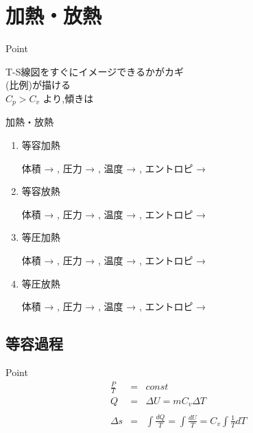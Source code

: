 \documentclass[a4paper]{jsarticle}
\begin{document}
\section{加熱・放熱}
\begin{itembox}[l]{Point}
    \begin{center}
        T-S線図をすぐにイメージできるかがカギ\\
        (比例)が描ける\\
        $C_p > C_v$ より,傾きは \\
    \end{center}
\end{itembox}
\begin{itembox}[l]{加熱・放熱}
    \begin{enumerate}[(1)]
        \item 等容加熱
              \begin{center}
                  体積 →  , 圧力 →  , 温度 →  , エントロピ → 
              \end{center}
        \item 等容放熱
              \begin{center}
                  体積 →  , 圧力 →  , 温度 →  , エントロピ → 
              \end{center}
        \item 等圧加熱
              \begin{center}
                  体積 →  , 圧力 →  , 温度 →  , エントロピ → 
              \end{center}
        \item 等圧放熱
              \begin{center}
                  体積 →  , 圧力 →  , 温度 →  , エントロピ → \\
              \end{center}
    \end{enumerate}
\end{itembox}
\subsection{等容過程}
\begin{itembox}[l]{Point}
    \begin{eqnarray*}
        \frac{P}{T}&=&const\\
        Q&=&\Delta U = mC_v\Delta T\\
        \\
        \Delta s&=&\int \frac{dQ}{T} = \int \frac{dU}{T} = C_v\int\frac{1}{T}dT\\
    \end{eqnarray*}
\end{itembox}
\end{document}
